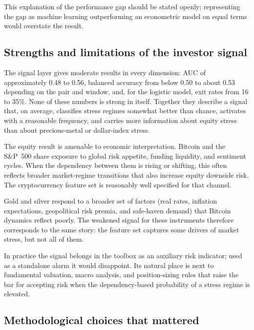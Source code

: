 This explanation of the performance gap should be stated openly; representing the gap as machine learning outperforming an econometric model on equal terms would overstate the result.

\subsection{Strengths and limitations of the investor signal}

The signal layer gives moderate results in every dimension: AUC of approximately 0.48 to 0.56, balanced accuracy from below 0.50 to about 0.53 depending on the pair and window, and, for the logistic model, exit rates from 16 to 35\%. None of these numbers is strong in itself. Together they describe a signal that, on average, classifies stress regimes somewhat better than chance, activates with a reasonable frequency, and carries more information about equity stress than about precious-metal or dollar-index stress.

The equity result is amenable to economic interpretation. Bitcoin and the S\&P~500 share exposure to global risk appetite, funding liquidity, and sentiment cycles. When the dependency between them is rising or shifting, this often reflects broader market-regime transitions that also increase equity downside risk. The cryptocurrency feature set is reasonably well specified for that channel.

Gold and silver respond to a broader set of factors (real rates, inflation expectations, geopolitical risk premia, and safe-haven demand) that Bitcoin dynamics reflect poorly. The weakened signal for these instruments therefore corresponds to the same story: the feature set captures some drivers of market stress, but not all of them.

In practice the signal belongs in the toolbox as an auxiliary risk indicator; used as a standalone alarm it would disappoint. Its natural place is next to fundamental valuation, macro analysis, and position-sizing rules that raise the bar for accepting risk when the dependency-based probability of a stress regime is elevated.

\subsection{Methodological choices that mattered}

